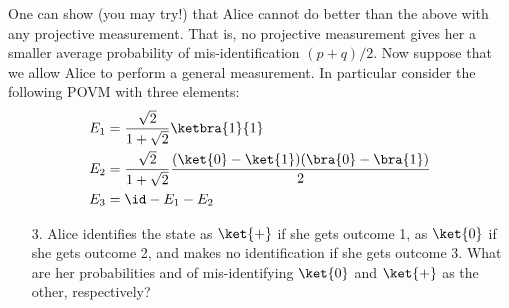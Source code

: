 \begin{exercises}
\begin{enumerate}
%
\end{enumerate}
One can show (you may try!) that Alice cannot do better than the above with any projective measurement. That is, no projective measurement gives her a smaller average probability of mis-identification $(p+q)/2$. Now suppose that we allow Alice to perform a general measurement. In particular consider the following POVM with three elements:
\begin{align*}
E_1 &= \frac{\sqrt{2}}{1+\sqrt{2}} \ketbra{1}{1} \\
E_2 &= \frac{\sqrt{2}}{1+\sqrt{2}} \frac{(\ket{0}-\ket{1})(\bra{0}-\bra{1})}{2} \\
E_3 &= \id - E_1 - E_2
\end{align*}
\begin{enumerate}
\item[3.] Alice identifies the state as $\ket{+}$ if she gets outcome 1, as $\ket{0}$ if she gets outcome 2, and makes no identification if she gets outcome 3. What are her probabilities and of mis-identifying $\ket{0}$ and $\ket{+}$ as the other, respectively?
%
\end{enumerate}


\end{exercises}

